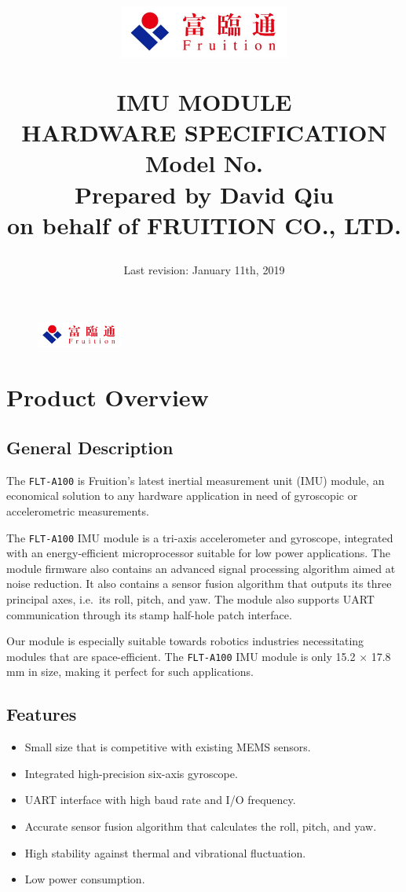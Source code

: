 \documentclass{scrreprt}
\title{
	\begin{figure}[H]
		\centering\includegraphics[width=0.5\textwidth]{logo.jpeg}
	\end{figure}
	\vspace{1cm}
	\flushright
	\Huge{IMU MODULE}\\
	\Huge{HARDWARE SPECIFICATION}\\
	\vspace{2cm}
	\huge{Model No. \modelno}\\
	\vspace{2cm}
	\LARGE{Prepared by David Qiu \\ on behalf of FRUITION CO., LTD.}
}
\date{
	Last revision: January 11th, 2019\\
}
\newcommand{\pchapter}[1]{
	\begingroup\let\clearpage\relax
	\newpage
	\begin{figure}[H]
		\includegraphics[width=0.25\textwidth]{logo.jpeg}
	\end{figure}
	\chapter{#1}
	\endgroup
}
\newcommand{\modelno}{%
	\texttt{FLT-A100}
}
\newcommand{\x}{
	$\times$
}
\begin{document}
\begin{CJK*}{UTF8}{gbsn}
\maketitle
\tableofcontents

\pchapter{Product Overview}
\section{General Description}
The \modelno is Fruition's latest inertial measurement unit (IMU) module, an
economical solution to any hardware application in need of gyroscopic or
accelerometric measurements.

The \modelno IMU module is a tri-axis accelerometer and gyroscope, integrated
with an energy-efficient microprocessor suitable for low power applications. The
module firmware also contains an advanced signal processing algorithm aimed at
noise reduction. It also contains a sensor fusion algorithm that outputs its
three principal axes, i.e.\ its roll, pitch, and yaw. The module also supports
UART communication through its stamp half-hole patch interface.

Our module is especially suitable towards robotics industries necessitating
modules that are space-efficient. The \modelno IMU module is only
15.2\x17.8 mm in size, making it perfect for such applications.

\section{Features}
\begin{itemize}
\item Small size that is competitive with existing MEMS sensors.

\item Integrated high-precision six-axis gyroscope.

\item UART interface with high baud rate and I/O frequency.

\item Accurate sensor fusion algorithm that calculates the roll, pitch, and yaw.

\item High stability against thermal and vibrational fluctuation.

\item Low power consumption.
\end{itemize}


\end{CJK*}
\end{document}
